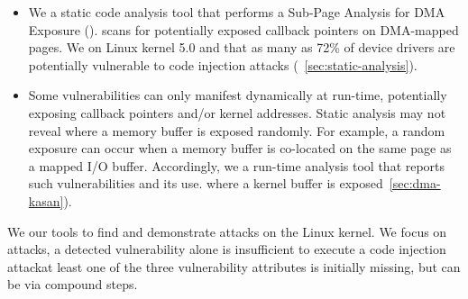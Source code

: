 \begin{itemize}
    \item We \DIFdelbegin {}\DIFdelend \DIFaddbegin {}\DIFaddend a static code analysis tool that performs a Sub-Page Analysis for DMA Exposure (\tool). \tool scans for potentially exposed callback pointers on DMA-mapped pages. We \DIFdelbegin {}\DIFdelend \DIFaddbegin {}\DIFaddend \tool on Linux kernel 5.0 and \DIFdelbegin {}\DIFdelend \DIFaddbegin {}\DIFaddend that as many as 72\% of device drivers are potentially vulnerable to code injection attacks (\DIFdelbegin {}\DIFdelend \DIFaddbegin {}\DIFaddend ~\ref{sec:static-analysis}). 

    \item Some \subpage{} vulnerabilities can only manifest dynamically at run-time, potentially exposing callback pointers and/or kernel addresses. Static analysis may not reveal  \DIFdelbegin {}\DIFdelend \DIFaddbegin {}\DIFaddend where a memory buffer is exposed randomly. For example, \DIFdelbegin {}\DIFdelend a random exposure can occur when a memory buffer is co-located on the same page as a mapped I/O buffer. Accordingly, we \DIFdelbegin {}\DIFdelend \DIFaddbegin {}\DIFaddend a run-time analysis tool \DIFdelbegin {}%
\DIFdel{) }\DIFdelend that reports such vulnerabilities and \DIFdelbegin {}\DIFdelend \DIFaddbegin {}\DIFaddend its use. \DIFaddbegin {}\DIFaddend \dkasan\DIFdelbegin {}\DIFdelend \DIFaddbegin {}\DIFaddend where a kernel buffer is exposed\DIFaddbegin {}\DIFaddend ~\DIFdelbegin {}\DIFdelend \ref{sec:dma-kasan}).
\end{itemize}

We \DIFdelbegin {}\DIFdelend \DIFaddbegin {}\DIFaddend our tools to find and demonstrate attacks on the Linux kernel. We focus on \compound attacks, \DIFdelbegin {}\DIFdelend \DIFaddbegin {}\DIFaddend a detected \subpage vulnerability alone is \DIFaddbegin {}\DIFaddend insufficient to execute a code injection attack\DIFdelbegin {}\DIFdelend \DIFaddbegin {}\DIFaddend at least one of the three vulnerability attributes is initially missing, but can be \DIFdelbegin {}\DIFdelend \DIFaddbegin {}\DIFaddend via compound steps. 

